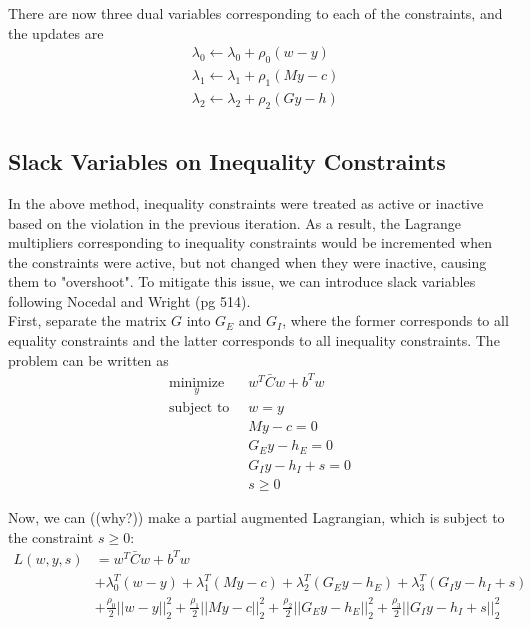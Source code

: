 \documentclass{article}
\begin{document}
There are now three dual variables corresponding to each of the constraints, and the updates are
\begin{align*}
&\lambda_0 \leftarrow \lambda_0 + \rho_0 (w - y) \\
&\lambda_1 \leftarrow \lambda_1 + \rho_1 (My - c) \\
&\lambda_2 \leftarrow \lambda_2 + \rho_2 (Gy - h) \\
\end{align*}


\subsection{Slack Variables on Inequality Constraints}

In the above method, inequality constraints were treated as active or inactive based on the violation in the previous iteration. As a result, the Lagrange multipliers corresponding to inequality constraints would be incremented when the constraints were active, but not changed when they were inactive, causing them to "overshoot". To mitigate this issue, we can introduce slack variables following Nocedal and Wright (pg 514). \\

First, separate the matrix $G$ into $G_E$ and $G_I$, where the former corresponds to all equality constraints and the latter corresponds to all inequality constraints. The problem can be written as
\begin{align*}
\underset{y}{\text{minimize}} \; \; &w^T \bar{C} w + b^T w \\
\text{subject to} \; \; &w = y \\
&My - c = 0 \\
&G_E y - h_E = 0 \\
&G_I y - h_I + s = 0 \\
&s \geq 0
\end{align*}

Now, we can ((why?)) make a partial augmented Lagrangian, which is subject to the constraint $s \geq 0$:
\begin{align*}
L(w, y, s) &= w^T \bar{C} w + b^T w \\
        &+ \lambda_0^T (w - y) + \lambda_1^T (My - c) + \lambda_{2}^T (G_E y - h_E) + \lambda_{3}^T (G_I y - h_I + s)\\
        &+ \frac{\rho_0}{2} ||w - y||_2^2 + \frac{\rho_1}{2} ||My - c||_2^2 + \frac{\rho_2}{2} ||G_E y - h_E||_2^2 + \frac{\rho_3}{2} ||G_I y - h_I + s||_2^2
\end{align*}
\end{document}
